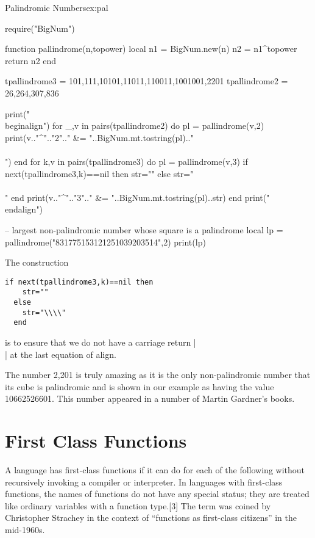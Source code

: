 \begin{texexample}{Palindromic Numbers}{ex:pal}
\begin{luacode}
require("BigNum")

function pallindrome(n,topower)
  local n1 = BigNum.new(n)
  n2 = n1^topower
  return n2
end


tpallindrome3 = {101,111,10101,11011,110011,1001001,2201}
tpallindrome2 = {26,264,307,836} 

print("\\begin{align}")
for _,v in pairs(tpallindrome2) do
  pl = pallindrome(v,2)
   print(v.."^".."2".." &= "..BigNum.mt.tostring(pl).."\\\\")
end 
for k,v in pairs(tpallindrome3) do
  pl = pallindrome(v,3)
  if next(tpallindrome3,k)==nil then
    str=""
  else
    str="\\\\"
  end  
  print(v.."^".."3".." &= "..BigNum.mt.tostring(pl)..str)
end 
print("\\end{align}")

-- largest non-palindromic number whose square is a palindrome
local lp = pallindrome("831775153121251039203514",2)
print(lp)

\end{luacode}
\end{texexample}

The construction
\begin{verbatim}
if next(tpallindrome3,k)==nil then
    str=""
  else
    str="\\\\"
  end 
\end{verbatim}
is to ensure that we do not have a carriage return |\\| at the last equation of align. 

The number 2,201 is truly amazing as it is the only non-palindromic number that its cube is palindromic and is shown in our example as having the value \num{10662526601}. This number appeared in a number of Martin Gardner's books.





\section{First Class Functions}

A language has first-class functions if it can do for each of the following without recursively invoking a compiler or interpreter. In languages with first-class functions, the names of functions do not have any special status; they are treated like ordinary variables with a function type.[3] The term was coined by Christopher Strachey in the context of \enquote{functions as first-class citizens} in the mid-1960s.

